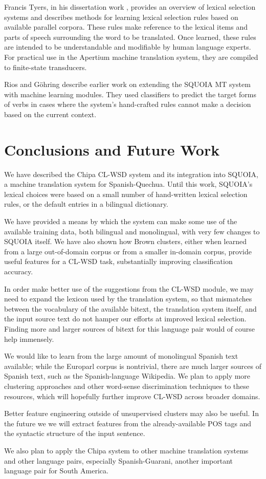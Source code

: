 \documentclass[10pt, a4paper]{article}
\begin{document}
Francis Tyers, in his dissertation work ,
provides an overview of lexical selection systems and describes methods for
learning lexical selection rules based on available parallel corpora. These
rules make reference to the lexical items and parts of speech surrounding the
word to be translated. Once learned, these rules are intended to be
understandable and modifiable by human language experts. For practical use in
the Apertium machine translation system, they are compiled to finite-state
transducers.

Rios and G\"{o}hring  describe
earlier work on extending the SQUOIA MT system with machine learning modules.
They used classifiers to predict the target forms of verbs in cases where the
system's hand-crafted rules cannot make a decision based on the current
context.

\section{Conclusions and Future Work}
We have described the Chipa CL-WSD system and its integration into SQUOIA,
a machine translation system for Spanish-Quechua.
Until this work, SQUOIA's lexical choices were based on a small number of
hand-written lexical selection rules, or the default entries in a bilingual
dictionary. 

We have provided a means by which the system can make some use of
the available training data, both bilingual and monolingual, with very few
changes to SQUOIA itself. We have also shown how Brown clusters, either when
learned from a large out-of-domain corpus or from a smaller in-domain corpus,
provide useful features for a CL-WSD task, substantially improving
classification accuracy.

In order make better use of the suggestions from the CL-WSD module, we may
need to expand the lexicon used by the translation system, so that mismatches
between the vocabulary of the available bitext, the translation system itself,
and the input source text do not hamper our efforts at improved lexical
selection. Finding more and larger sources of bitext for this language pair
would of course help immensely.

We would like to learn from the large amount of monolingual Spanish text
available; while the Europarl corpus is nontrivial, there are much larger
sources of Spanish text, such as the Spanish-language Wikipedia. We plan
to apply more clustering approaches and other word-sense discrimination
techniques to these resources, which will hopefully further improve CL-WSD
across broader domains.

Better feature engineering outside of unsupervised clusters may also be useful.
In the future we we will extract features from the already-available POS tags
and the syntactic structure of the input sentence.

We also plan to apply the Chipa system to other machine translation systems and
other language pairs, especially Spanish-Guarani, another important language
pair for South America.



\end{document}
